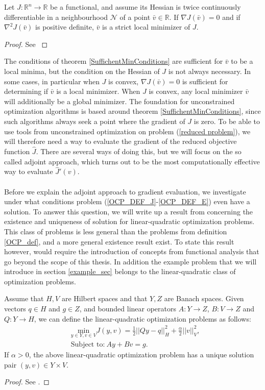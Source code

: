 \begin{theorem} \label{SuffichentMinConditions}
Let $J:\mathbb{R}^n\rightarrow\mathbb{R}$ be a functional, and assume its Hessian is twice continuously differentiable in a neighbourhood $ \mathcal{N}$ of a point $\bar v\in\mathbb{R}$. If $\nabla J(\bar v)=0$ and if $\nabla^2 J(\bar v)$ is positive definite, $\bar v$ is a strict local minimizer of $J$.
\end{theorem}
\begin{proof}
See \cite{nocedal2006numerical}
\end{proof}
\noindent
The conditions of theorem \ref{SuffichentMinConditions} are sufficient for $\bar v$ to be a local minima, but the condition on the Hessian of $J$ is not always necessary. In some cases, in particular when $J$ is convex, $\nabla J(\bar v)=0$ is sufficient for determining if $\bar v$ is a local minimizer. When $J$ is convex, any local minimizer $\bar v$ will additionally be a global minimizer. The foundation for unconstrained optimization algorithms is based around theorem \ref{SuffichentMinConditions}, since such algorithms always seek a point where the gradient of $J$ is zero. To be able to use tools from unconstrained optimization on problem (\ref{reduced problem}), we will therefore need a way to evaluate the gradient of the reduced objective function $\hat J$. There are several ways of doing this, but we will focus on the so called adjoint approach, which turns out to be the most computationally effective way to evaluate $\hat J'(v)$.
\\
\\
Before we explain the adjoint approach to gradient evaluation, we investigate under what conditions problem (\ref{OCP_DEF_J}-\ref{OCP_DEF_E}) even have a solution. To answer this question, we will write up a result from \cite{hinze2008optimization} concerning the existence and uniqueness of solution for linear-quadratic optimization problems. This class of problems is less general than the problems from definition \ref{OCP_def}, and a more general existence result exist. To state this result however, would require the introduction of concepts from functional analysis that go beyond the scope of this thesis. In addition the example problem that we will introduce in section \ref{example_sec} belongs to the linear-quadratic class of optimization problems. 
\begin{theorem} \label{existence}
Assume that $H,V$ are Hilbert spaces and that $Y,Z$ are Banach spaces. Given vectors $q\in H$ and $g\in Z$, and bounded linear operators $A:Y\rightarrow Z$, $B:V\rightarrow Z$ and $Q:Y\rightarrow H$, we can define the linear-quadratic optimization problems as follows:
\begin{align*}
&\underset{y\in Y,v\in V}{\text{min}}J(y,v) = \frac{1}{2}||Qy-q||_H^2 + \frac{\alpha}{2}||v||_V^2, \\
&\textrm{Subject to:} \ Ay + Bv = g.
\end{align*}
If $\alpha>0$, the above linear-quadratic optimization problem has a unique solution pair $(y,v)\in Y\times V$.
\end{theorem}   
\begin{proof}
See \cite{hinze2008optimization}.
\end{proof}
\noindent 
